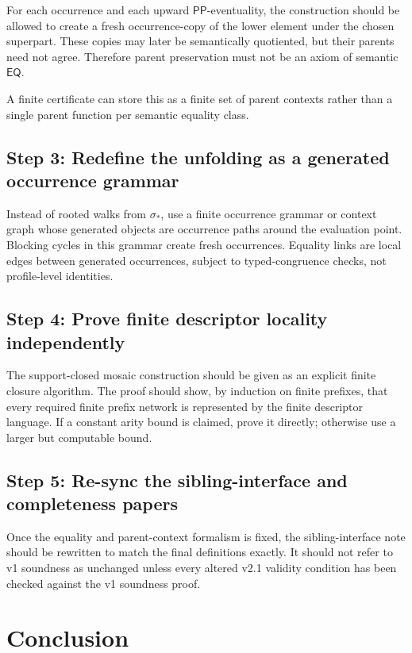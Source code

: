 \documentclass[11pt]{article}
\newcommand{\PP}{\mathsf{PP}}
\newcommand{\EQ}{\mathsf{EQ}}
\begin{document}
For each occurrence and each upward \(\PP\)-eventuality, the construction should
be allowed to create a fresh occurrence-copy of the lower element under the
chosen superpart.  These copies may later be semantically quotiented, but their
parents need not agree.  Therefore parent preservation must not be an axiom of
semantic \(\EQ\).

A finite certificate can store this as a finite set of parent contexts rather
than a single parent function per semantic equality class.

\subsection{Step 3: Redefine the unfolding as a generated occurrence grammar}

Instead of rooted walks from \(\sigma_\ast\), use a finite occurrence grammar or
context graph whose generated objects are occurrence paths around the evaluation
point.  Blocking cycles in this grammar create fresh occurrences.  Equality
links are local edges between generated occurrences, subject to typed-congruence
checks, not profile-level identities.

\subsection{Step 4: Prove finite descriptor locality independently}

The support-closed mosaic construction should be given as an explicit finite
closure algorithm.  The proof should show, by induction on finite prefixes, that
every required finite prefix network is represented by the finite descriptor
language.  If a constant arity bound is claimed, prove it directly; otherwise
use a larger but computable bound.

\subsection{Step 5: Re-sync the sibling-interface and completeness papers}

Once the equality and parent-context formalism is fixed, the sibling-interface
note should be rewritten to match the final definitions exactly.  It should not
refer to v1 soundness as unchanged unless every altered v2.1 validity condition
has been checked against the v1 soundness proof.

\section{Conclusion}
\end{document}

